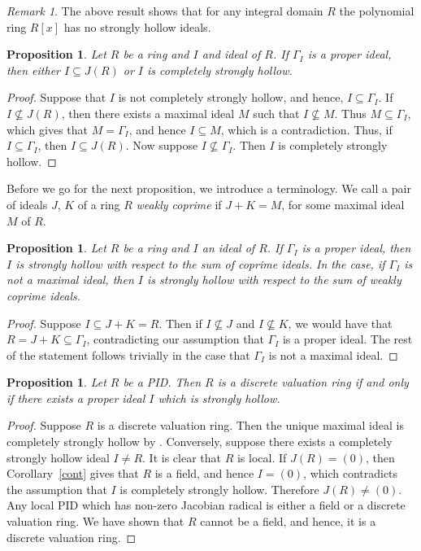 \documentclass[11pt,english]{amsart}
\newtheorem{proposition}[theorem]{Proposition}
\theoremstyle{definition}
\numberwithin{equation}{section}
\theoremstyle{remark}
\newtheorem{remark}[theorem]{Remark}
\begin{document}
\begin{remark}
The above result shows that for any integral domain $R$ the polynomial ring $R[x]$ has no strongly hollow ideals.	
\end{remark}

\begin{proposition}
        Let $R$ be a ring and $I$ and ideal of $R$. If $\Gamma_I$ is a proper ideal, then either $I\subseteq J(R)$ or $I$ is completely strongly hollow.
\end{proposition}

\begin{proof}
    Suppose that $I$ is not completely strongly hollow, and hence, $I\subseteq \Gamma_I$. If $I\not\subseteq J(R)$, then there exists a maximal ideal $M$ such that $I\not\subseteq M$. Thus $M\subseteq \Gamma_I$, which gives that $M=\Gamma_I$, and hence $I\subseteq M$, which is a contradiction. Thus, if $I\subseteq \Gamma_I$, then $I\subseteq J(R)$. Now suppose $I\not\subseteq\Gamma_I$. Then $I$ is completely strongly hollow.
\end{proof}

Before we go for the next proposition, we introduce a terminology. We call a pair of ideals $J$, $K$ of a ring $R$ \emph{weakly coprime} if $J+K=M$, for some maximal ideal $M$ of $R$.

\begin{proposition}
 Let $R$ be a ring and $I$ an ideal of $R$. If $\Gamma_I$ is a proper ideal, then $I$ is strongly hollow with respect to the sum of coprime ideals. In the case, if $\Gamma_I$ is not a maximal ideal, then $I$ is strongly hollow with respect to the sum of weakly coprime ideals.
\end{proposition}

\begin{proof}
Suppose $I\subseteq J+K=R$. Then if $I\not\subseteq J$ and $I\not\subseteq K$, we would have that $R=J+K\subseteq \Gamma_I$, contradicting our assumption that $\Gamma_I$ is a proper ideal. The rest of the statement follows trivially in the case that $\Gamma_I$ is not a maximal ideal.
\end{proof}

\begin{proposition}\label{PID_to_DVR}
    Let $R$ be a PID. Then $R$ is a discrete valuation ring if and only if there exists a proper ideal $I$ which is strongly hollow.
\end{proposition}

\begin{proof}
   Suppose $R$ is a discrete valuation ring. Then the unique maximal ideal is completely strongly hollow by \cite[Proposition.~1.11]{Rostami2021}. Conversely, suppose there exists a completely strongly hollow ideal $I\neq R$. It is clear that $R$ is local. If $J(R)=(0)$, then Corollary~\ref{cont} gives that $R$ is a field, and hence $I=(0)$, which contradicts the assumption that $I$ is completely strongly hollow. Therefore $J(R)\neq(0)$. Any local PID which has non-zero Jacobian radical is either a field or a discrete valuation ring. We have shown that $R$ cannot be a field, and hence, it is a discrete valuation ring. 
\end{proof}
\end{document}
